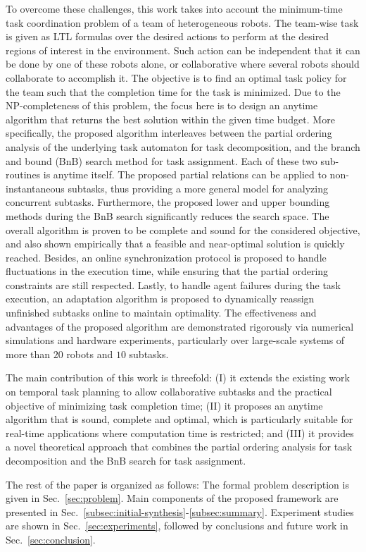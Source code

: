 To overcome these challenges,
this work takes into account the minimum-time task coordination problem of a team of heterogeneous robots.
The team-wise task is given as LTL formulas over the desired actions to perform at the
desired regions of interest in the environment.
Such action can be independent that it can be done by one of these robots alone,
or collaborative where several robots should collaborate to accomplish it.
The objective is to find an optimal task policy for the team such that the completion time for the task is minimized.
Due to the NP-completeness of this problem,
the focus here is to design an anytime algorithm that returns the best solution within the given time budget.
More specifically,
the proposed algorithm interleaves between the partial ordering analysis
of the underlying task automaton for task decomposition,
and the branch and bound (BnB) search method for task assignment.
Each of these two sub-routines is anytime itself.
The proposed partial relations can be applied to non-instantaneous subtasks,
thus providing a more general model for analyzing concurrent subtasks.
Furthermore, the proposed lower and upper bounding methods during the BnB search
significantly reduces the search space.
The overall algorithm is proven to be complete and sound for the considered objective,
and also shown empirically that a feasible and near-optimal solution is quickly reached.
Besides,
an online synchronization protocol is proposed to handle fluctuations in the execution time,
while ensuring that the partial ordering constraints are still respected.
Lastly, to handle agent failures during the task execution,
an adaptation algorithm is proposed to dynamically reassign unfinished subtasks
online to maintain optimality.
The effectiveness and advantages of the proposed algorithm
are demonstrated rigorously via numerical simulations and hardware experiments,
particularly over {large-scale} systems of more than $20$ robots and $10$ subtasks.


The main contribution of this work is threefold:
(I) it extends the existing work on temporal task planning to allow collaborative subtasks
and the practical objective of minimizing task completion time;
(II) it proposes an anytime algorithm that is sound, complete and optimal,
which is particularly suitable for real-time applications where computation time is restricted;
and (III) it provides a novel theoretical approach that combines the partial ordering
analysis for task decomposition and the BnB search for task assignment.

The rest of the paper is organized as follows:
The formal problem description is given in Sec.~\ref{sec:problem}.
Main components of the proposed framework are presented in
Sec.~\ref{subsec:initial-synthesis}-\ref{subsec:summary}.
Experiment studies are shown in Sec.~\ref{sec:experiments},
followed by conclusions and future work in Sec.~\ref{sec:conclusion}.

